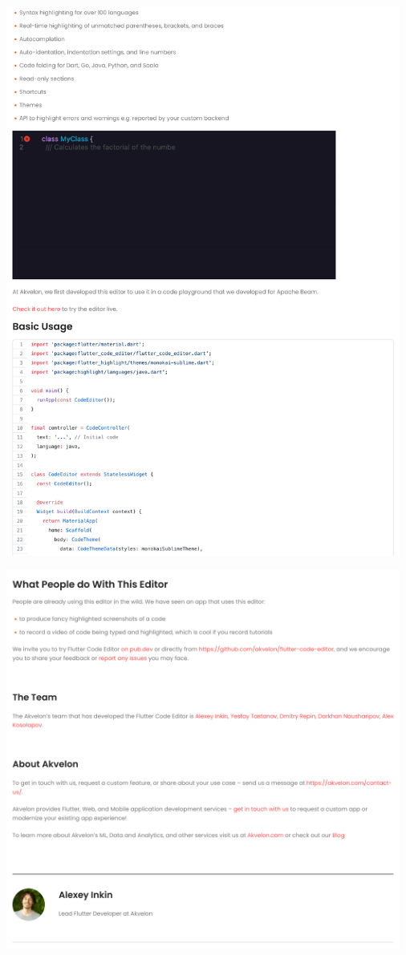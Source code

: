 \Continuing
\begin{center}
    \includegraphics[width=35em]{flutter-code-editor-announcement-p2}
\end{center}
\pagebreak

\begin{center}
    \includegraphics[width=35em]{flutter-code-editor-announcement-bottom}
\end{center}

\pagebreak
